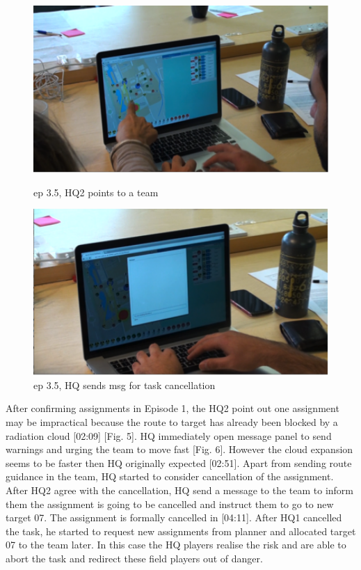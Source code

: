 \begin{figure}[ht]
\centering
\begin{minipage}[b]{0.45\linewidth}
\includegraphics[width=1\textwidth]{img/study3/ep51}
\caption{ep 3.5, HQ2 points to a team}
\label{fig:study1ep13}
\end{minipage}
\quad
\begin{minipage}[b]{0.45\linewidth}
 \includegraphics[width=1\textwidth]{img/study3/ep52}
\caption{ep 3.5, HQ sends msg for task cancellation}
\label{fig:study1ep14}
\end{minipage}
\end{figure}

After confirming assignments in Episode 1, the HQ2 point out one assignment may be impractical because the route to target has already been blocked by a radiation cloud [02:09] [Fig. 5]. HQ immediately open message panel to send warnings and urging the team to move fast [Fig. 6]. However the cloud expansion seems to be faster then HQ originally expected [02:51]. Apart from sending route guidance in the team, HQ started to consider cancellation of the assignment. After HQ2 agree with the cancellation, HQ send a message to the team to inform them the assignment is going to be cancelled and instruct them to go to new target 07. The assignment is formally cancelled in [04:11]. After HQ1 cancelled the task, he started to request new assignments from planner and allocated target 07 to the team later. In this case the HQ players realise the risk and are able to abort the task and redirect these field players out of danger.\\

